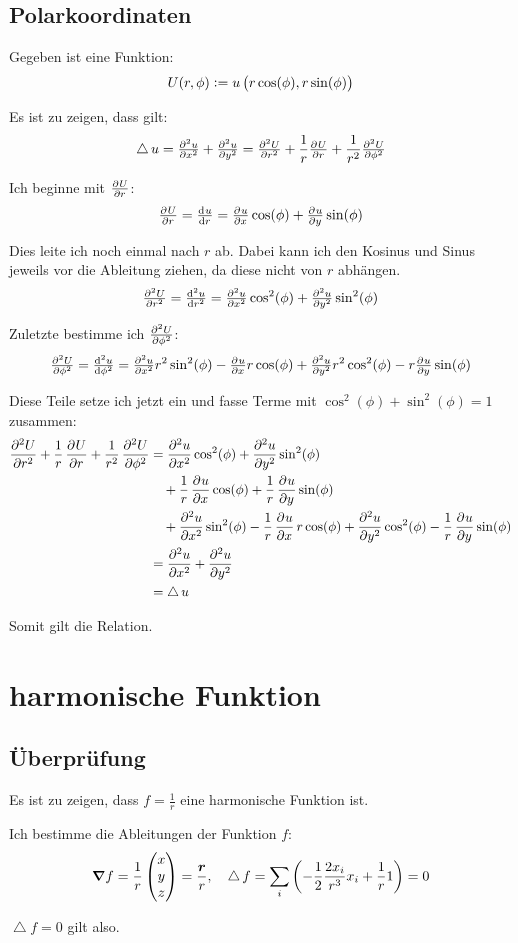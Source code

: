 \documentclass[11pt, ngerman]{article}
\newcommand{\laplace}{\mathop{{}\bigtriangleup}\nolimits}
\newcommand{\vnabla}{\vec \nabla}
\renewcommand{\vec}[1]{\boldsymbol{#1}}
\begin{document}
\subsection{Polarkoordinaten}

Gegeben ist eine Funktion:
\[
	U(r, \phi) := u\del{r \cos(\phi), r \sin(\phi)}
\]

Es ist zu zeigen, dass gilt:
\[
	\laplace u = \pd[2] ux + \pd[2] uy = \pd[2] Ur + \frac 1r \pd Ur + \frac
	1{r^2} \pd[2] U\phi
\]

Ich beginne mit $\pd U r$:
\[
	\pd Ur = \od ur = \pd ux \cos(\phi) + \pd uy \sin(\phi)
\]

Dies leite ich noch einmal nach $r$ ab. Dabei kann ich den Kosinus und Sinus
jeweils vor die Ableitung ziehen, da diese nicht von $r$ abhängen.
\[
	\pd[2] Ur = \od[2] ur = \pd[2] ux \cos^2(\phi) + \pd[2] uy \sin^2(\phi)
\]

Zuletzte bestimme ich $\pd[2] U\phi$:
\[
	\pd[2] U\phi = \od[2] u\phi = \pd[2] ux r^2 \sin^2(\phi) - \pd ux r
	\cos(\phi) + \pd[2] uy r^2 \cos^2(\phi) - r \pd uy \sin(\phi)
\]

Diese Teile setze ich jetzt ein und fasse Terme mit $\cos^2(\phi) +
\sin^2(\phi) = 1$ zusammen:
%
\begin{align*}
	\dpd[2] Ur + \frac 1r \dpd Ur + \frac 1{r^2} \dpd[2] U\phi
	&=\dpd[2] ux \cos^2(\phi) + \dpd[2] uy \sin^2(\phi) \\
	&\quad+ \frac 1r \dpd ux \cos(\phi) + \frac 1r \dpd uy \sin(\phi) \\
	&\quad+ \dpd[2] ux \sin^2(\phi) - \frac 1r \dpd ux r \cos(\phi) + \dpd[2]
	uy \cos^2(\phi) - \frac 1r \dpd uy \sin(\phi) \\
	&= \dpd[2] ux + \dpd[2] uy \\
	&= \laplace u
\end{align*}

Somit gilt die Relation.

\section{harmonische Funktion}

\subsection{Überprüfung}

Es ist zu zeigen, dass $f = \frac 1r$ eine harmonische Funktion ist.

Ich bestimme die Ableitungen der Funktion $f$:
\[
	\vnabla f = \frac{1}{r} \begin{pmatrix}
		x \\ y \\ z
	\end{pmatrix} = \frac{\vec r}{r}
	,\quad
	\laplace f = \sum_i \del{- \frac12 \frac{2x_i}{r^3} x_i + \frac 1r 1} = 0
\]

$\laplace f = 0$ gilt also.



\end{document}
